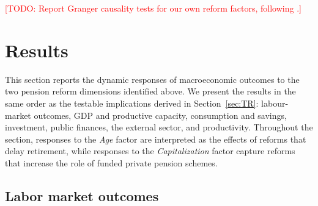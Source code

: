 \documentclass[11pt,english,a4paper, twoside, authoryear]{article}
\begin{document}
\textcolor{red}{[TODO: Report Granger causality tests for our own reform factors, following \citet{BiZubairy2023}.]}

\section{Results}
\label{sec:results}




This section reports the dynamic responses of macroeconomic outcomes to the two pension reform dimensions identified above. We present the results in the same order as the testable implications derived in Section~\ref{sec:TR}: labour-market outcomes, GDP and productive capacity, consumption and savings, investment, public finances, the external sector, and productivity. Throughout the section, responses to the \emph{Age} factor are interpreted as the effects of reforms that delay retirement, while responses to the \emph{Capitalization} factor capture reforms that increase the role of funded private pension schemes.


\FloatBarrier
\subsection{Labor market outcomes}
\label{sec:labor}
\label{sec:labor}
\end{document}
